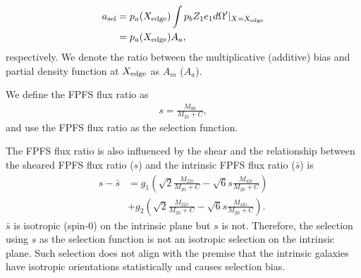 \begin{equation}
\begin{split}
a_{\rm{sel}}&=p_a(X_{\rm{edge}}) \int p_b Z_1 e_1 d\Omega'|_{X=X_{\rm{edge}}} \\
            &=p_a(X_{\rm{edge}}) A_a,
\end{split}
\end{equation}
respectively. We denote the ratio between the multiplicative (additive) bias and partial density function
at $X_{\rm{edge}}$ as $A_{m}$ ($A_{a}$).

We define the FPFS flux ratio as
\begin{align}\label{select_define}
s = \frac{M_{00}}{M_{20}+C},
\end{align}
and use the FPFS flux ratio as the selection function.

The FPFS flux ratio is also influenced by the shear and the relationship
between the sheared FPFS flux ratio ($s$) and the intrinsic FPFS flux ratio
($\bar{s}$) is
\begin{align}\label{select_transform}
s-\bar{s} &=g_1 (\sqrt{2}\frac{M_{22c}}{M_{20}+C}
    -\sqrt{6}s\frac{M_{42c}}{M_{20}+C}) \\
    &+g_2 (\sqrt{2}\frac{M_{22s}}{M_{20}+C}
    -\sqrt{6}s\frac{M_{42s}}{M_{20}+C}).
\end{align}
$\bar{s}$ is isotropic (spin-0) on the intrinsic plane but $s$ is not.
Therefore, the selection using $s$ as the selection function is not an
isotropic selection on the intrinsic plane. Such selection does not align with
the premise that the intrinsic galaxies have isotropic orientations
statistically and causes selection bias.
